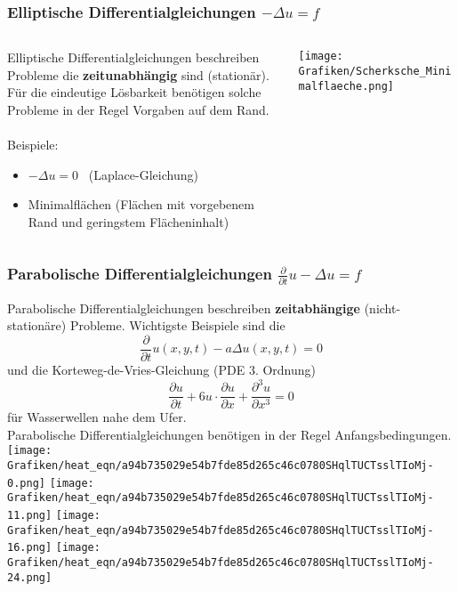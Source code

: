 \begin{frame}\frametitle{Elliptische Differentialgleichungen $-\Delta u = f$}
\begin{columns}[T] %
	\begin{column}{.55\textwidth}
		Elliptische Differentialgleichungen beschreiben Probleme die \textbf{zeitunabhängig} sind (stationär).\\ Für die eindeutige Lösbarkeit benötigen solche Probleme in der Regel Vorgaben auf dem Rand.\\
		\quad\\
Beispiele:
\begin{itemize}
	\item $-\Delta u=0$ \ (Laplace-Gleichung)
	\item Minimalflächen (Flächen mit vorgebenem Rand und geringstem Flächeninhalt)
\end{itemize}
	\end{column}%
\hfill%
\begin{column}{.45\textwidth}
\texttt{[image: Grafiken/Scherksche\_Minimalflaeche.png]}
\end{column}%
\end{columns}
\end{frame}
%
%
\begin{frame}\frametitle{Parabolische Differentialgleichungen $\frac{\partial}{\partial t}u-\Delta u = f$}
\small
Parabolische Differentialgleichungen beschreiben \textbf{zeitabhängige} (nicht-stationäre) Probleme. Wichtigste Beispiele sind die  
$$
\frac{\partial}{\partial t} u(x,y,t) - a\Delta u(x,y,t) = 0
$$
und die Korteweg-de-Vries-Gleichung (PDE 3. Ordnung)
$$
  \frac{\partial u}{\partial t}
  + 6 u \cdot \frac{\partial u}{\partial x}
  + \frac{\partial^3 u}{\partial x^3} = 0
$$
für Wasserwellen nahe dem Ufer.\\
Parabolische Differentialgleichungen benötigen in der Regel Anfangsbedingungen.\\
\texttt{[image: Grafiken/heat\_eqn/a94b735029e54b7fde85d265c46c0780SHqlTUCTsslTIoMj-0.png]}
\texttt{[image: Grafiken/heat\_eqn/a94b735029e54b7fde85d265c46c0780SHqlTUCTsslTIoMj-11.png]}
\texttt{[image: Grafiken/heat\_eqn/a94b735029e54b7fde85d265c46c0780SHqlTUCTsslTIoMj-16.png]}
\texttt{[image: Grafiken/heat\_eqn/a94b735029e54b7fde85d265c46c0780SHqlTUCTsslTIoMj-24.png]}
\end{frame}
%
%
